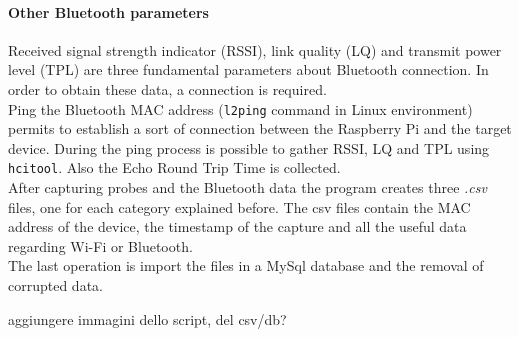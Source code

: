 \paragraph{Other Bluetooth parameters}
Received signal strength indicator (RSSI), link quality (LQ) and transmit power level (TPL) are three fundamental parameters about Bluetooth connection. In order to obtain these data, a connection is required.\\
Ping the Bluetooth MAC address (\texttt{l2ping} command in Linux environment) permits to establish a sort of connection between the Raspberry Pi and the target device. During the ping process is possible to gather RSSI, LQ and TPL using \texttt{hcitool}. Also the Echo Round Trip Time is collected.\\
\linebreak
After capturing probes and the Bluetooth data the program creates three \textit{.csv} files, one for each category explained before. The csv files contain the MAC address of the device, the timestamp of the capture and all the useful data regarding Wi-Fi or Bluetooth.\\
The last operation is import the files in a MySql database and the removal of corrupted data.

aggiungere immagini dello script, del csv/db?